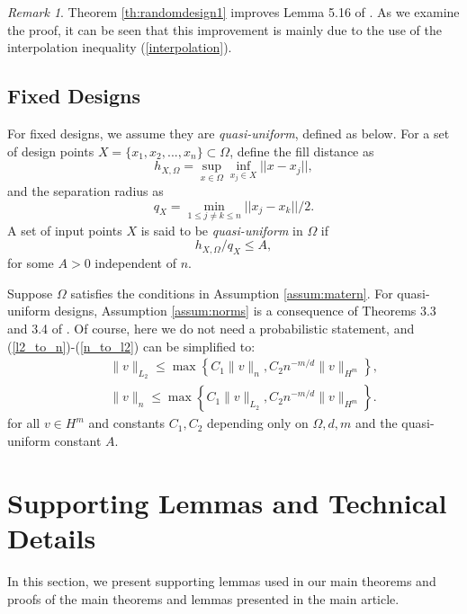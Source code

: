 \documentclass[12pt]{article}
\theoremstyle{plain}
\theoremstyle{remark}
\newtheorem{remark}{Remark}
\begin{document}
\begin{remark}
   Theorem \ref{th:randomdesign1} improves Lemma 5.16 of \cite{geer2000empirical}. As we examine the proof, it can be seen that this improvement is mainly due to the use of the interpolation inequality (\ref{interpolation}).
\end{remark}

\subsection{Fixed Designs}


For fixed designs, we assume they are \textit{quasi-uniform}, defined as below. For a set of design points $X = \{x_1, x_2,...,x_n\}\subset \Omega$, define the fill distance as
$$h_{X, \Omega}=\sup_{x\in \Omega} \inf_{x_j \in X}||x-x_j||,$$
and the separation radius as
$$q_X = \min_{1\leq j\neq k\leq n}||x_j-x_k||/2.$$
    A set of input points $X$ is said to be \textit{quasi-uniform} in $\Omega$ if
    \[h_{X,\Omega}/q_X\leq A,\]
for some $A>0$ independent of $n$.


Suppose $\Omega$ satisfies the conditions in Assumption \ref{assum:matern}.
For quasi-uniform designs, Assumption \ref{assum:norms} is a consequence of Theorems 3.3 and 3.4 of \cite{utreras1988convergence}. Of course, here we do not need a probabilistic statement, and (\ref{l2_to_n})-(\ref{n_to_l2}) can be simplified to:
    \begin{eqnarray*}
        &&\|v\|_{L_2}\leq \max\left\{C_1 \|v\|_{n},C_2 n^{-m/d}\|v\|_{H^m}\right\},\\
        &&\|v\|_n\leq \max\left\{C_1\|v\|_{L_2},C_2 n^{-m/d}\|v\|_{H^m}\right\}.
    \end{eqnarray*}
    for all $v\in H^m$ and constants $C_1,C_2$ depending only on $\Omega,d,m$ and the quasi-uniform constant $A$.





\section{Supporting Lemmas and Technical Details}\label{sec:proofs_main}
In this section, we present supporting lemmas used in our main theorems and  proofs of the main theorems and lemmas presented in the main article. 
\end{document}
